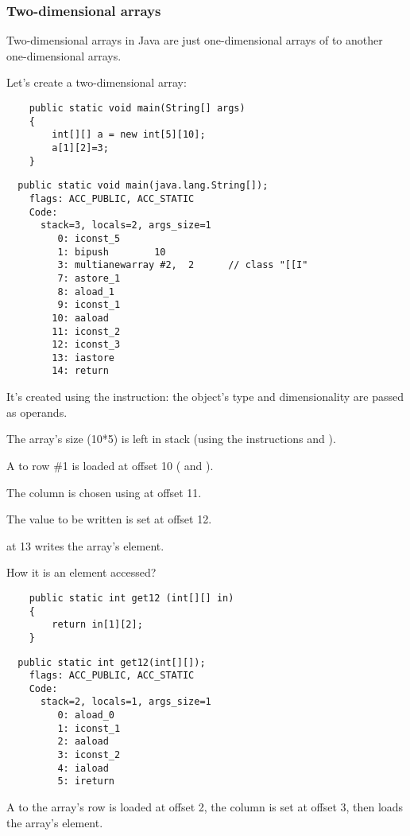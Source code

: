 \subsubsection{Two-dimensional arrays}

Two-dimensional arrays in Java are just one-dimensional arrays of  to another 
one-dimensional arrays.


Let's create a two-dimensional array:

\begin{lstlisting}
	public static void main(String[] args)
	{
		int[][] a = new int[5][10];
		a[1][2]=3;
	}
\end{lstlisting}

\begin{lstlisting}
  public static void main(java.lang.String[]);
    flags: ACC_PUBLIC, ACC_STATIC
    Code:
      stack=3, locals=2, args_size=1
         0: iconst_5      
         1: bipush        10
         3: multianewarray #2,  2      // class "[[I"
         7: astore_1      
         8: aload_1       
         9: iconst_1      
        10: aaload        
        11: iconst_2      
        12: iconst_3      
        13: iastore       
        14: return        
\end{lstlisting}

It's created using the  instruction: the object's type and dimensionality are passed
as operands.

The array's size (10*5) is left in stack (using the instructions  and ).


A  to row \#1 is loaded at offset 10 ( and ).

The column is chosen using  at offset 11.

The value to be written is set at offset 12.

 at 13 writes the array's element.


How it is an element accessed?

\begin{lstlisting}
	public static int get12 (int[][] in)
	{
		return in[1][2];
	}
\end{lstlisting}

\begin{lstlisting}
  public static int get12(int[][]);
    flags: ACC_PUBLIC, ACC_STATIC
    Code:
      stack=2, locals=1, args_size=1
         0: aload_0       
         1: iconst_1      
         2: aaload        
         3: iconst_2      
         4: iaload        
         5: ireturn       
\end{lstlisting}

A  to the array's row is loaded at offset 2, the column is set at offset 3, 
then  loads the array's element.

